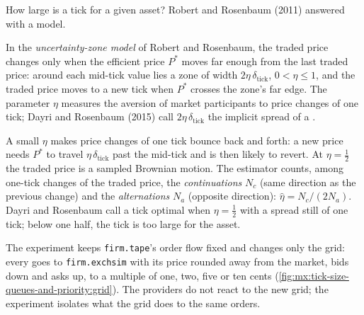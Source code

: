 How large is a tick for a given asset? Robert and Rosenbaum (2011) answered with a model.

\begin{definition}\label{def:mx:tick-size-queues-and-priority:uz}
In the \emph{uncertainty-zone model} of Robert and Rosenbaum, the traded price changes only when the efficient price
$P^\ast$ moves far enough from the last traded price: around each mid-tick value lies a zone of width $2\eta\,\delta_{\mathrm{tick}}$, $0<\eta\le1$, and
the traded price moves to a new tick when $P^\ast$ crosses the zone's far edge. The parameter $\eta$ measures the aversion of market participants to
price changes of one tick; Dayri and Rosenbaum (2015) call $2\eta\,\delta_{\mathrm{tick}}$ the implicit spread of a .
\end{definition}

A small $\eta$ makes price changes of one tick bounce back and forth: a new price needs $P^\ast$ to travel $\eta\,\delta_{\mathrm{tick}}$ past the mid-tick
and is then likely to revert. At $\eta=\tfrac12$ the traded price is a sampled Brownian motion. The estimator counts, among one-tick changes of the
traded price, the \emph{continuations} $N_c$ (same direction as the previous change) and the \emph{alternations} $N_a$ (opposite direction):
$\hat\eta=N_c/(2N_a)$. Dayri and Rosenbaum call a tick optimal when $\eta=\tfrac12$ with a spread still of one tick; below one half, the tick is too
large for the asset.

\label{lst:mx:tick-size-queues-and-priority:eta}

The experiment keeps \texttt{firm.tape}'s order flow fixed and changes only the grid: every  goes to \texttt{firm.exchsim} with its price
rounded away from the market, bids down and asks up, to a multiple of one, two, five or ten cents (\cref{fig:mx:tick-size-queues-and-priority:grid}).
The providers do not react to the new grid; the experiment isolates what the grid does to the same orders.

\label{lst:mx:tick-size-queues-and-priority:coarse}

